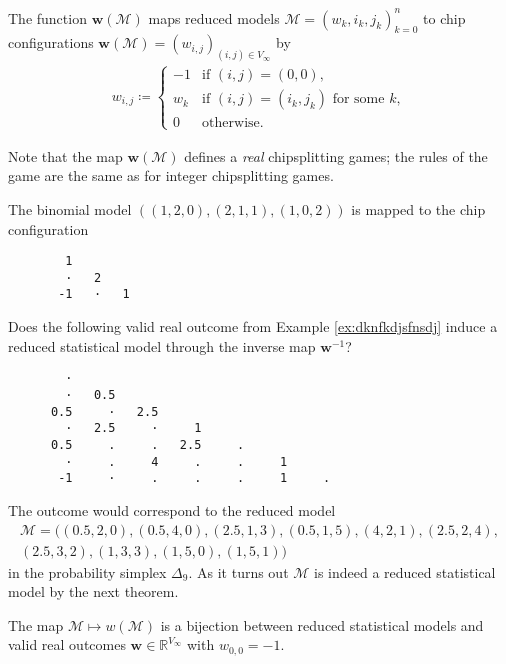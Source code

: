 The function \( \mathbf w(\mathcal{M}) \) maps reduced models \( \mathcal{M} = (w_k, i_k, j_k)^{n}_{k=0} \) to chip configurations \( \mathbf w(\mathcal{M}) = (w_{i,j})_{(i,j) \in V_\infty} \) by 
\begin{align*}
    w_{i,j} \coloneqq \begin{cases}
        -1 & \text{if } (i,j) = (0,0), \\
        w_k & \text{if } (i,j) = (i_k, j_k) \text{ for some } k, \\
        0 & \text{otherwise}.
    \end{cases}
\end{align*}

Note that the map \( \mathbf w(\mathcal{M}) \) defines a \emph{real} chipsplitting games; the rules of the game are the same as for integer chipsplitting games.

\begin{example}
    The binomial model \( ((1,2,0), (2,1,1), (1,0,2)) \) is mapped to the chip configuration
    \begin{verbatim}
        1
        ·   2  
       -1   ·   1
    \end{verbatim}
\end{example}

\begin{example}
    Does the following valid real outcome from Example \ref{ex:dknfkdjsfnsdj} induce a reduced statistical model through the inverse map \( \mathbf w^{-1} \)?
    \begin{verbatim}
        · 
        ·   0.5 
      0.5     ·   2.5 
        ·   2.5     ·     1 
      0.5     .     .   2.5     . 
        ·     .     4     .     .     1 
       -1     ·     .     .     .     1     . 
    \end{verbatim} 
    The outcome would correspond to the reduced model
    \begin{gather*}
        \mathcal{M} = ((0.5, 2, 0), (0.5, 4, 0), (2.5, 1,3), (0.5, 1, 5), (4, 2,1), (2.5, 2, 4),\\ (2.5, 3,2), (1, 3,3), (1, 5,0), (1,5,1))
    \end{gather*}
    in the probability simplex \( \Delta_9 \). As it turns out \( \mathcal{M} \) is indeed a reduced statistical model by the next theorem.
\end{example}

\begin{theorem}\label{thm:outcome-reduced-model}
    The map \( \mathcal{M} \mapsto w(\mathcal{M}) \) is a bijection between reduced statistical models and valid real outcomes \( \mathbf w \in \mathbb{R}^{V_\infty} \) with \( w_{0,0} = -1 \).
\end{theorem}

